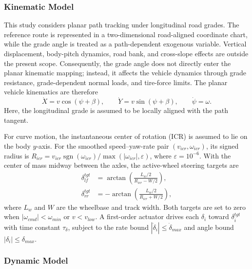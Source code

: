 \documentclass{ieeeaccess}
\begin{document}
\subsubsection{Kinematic Model}

This study considers planar path tracking under longitudinal road grades. The reference route is represented in a two-dimensional road-aligned coordinate chart, while the grade angle is treated as a path-dependent exogenous variable. Vertical displacement, body-pitch dynamics, road bank, and cross-slope effects are outside the present scope. Consequently, the grade angle does not directly enter the planar kinematic mapping; instead, it affects the vehicle dynamics through grade resistance, grade-dependent normal loads, and tire-force limits. The planar vehicle kinematics are therefore
\begin{equation}
\dot X=v\cos(\psi+\beta),\qquad
\dot Y=v\sin(\psi+\beta),\qquad
\dot\psi=\omega.
\label{eq:agv_kinematics}
\end{equation}
Here, the longitudinal grade is assumed to be locally aligned with the path tangent.

For curve motion, the instantaneous center of rotation (ICR) is assumed to lie on the body $y$-axis. For the smoothed speed--yaw-rate pair $(v_{icr},\omega_{icr})$, its signed radius is $R_{icr}=v_{icr}\operatorname{sgn}(\omega_{icr})/\max(|\omega_{icr}|,\varepsilon)$, where $\varepsilon=10^{-6}$. With the center of mass midway between the axles, the active-wheel steering targets are
\begin{equation}
\begin{aligned}
\delta_{lf}^{tgt}&=\arctan\!\left(\frac{L_w/2}{R_{icr}-W/2}\right),\\
\delta_{rr}^{tgt}&=-\arctan\!\left(\frac{L_w/2}{R_{icr}+W/2}\right),
\end{aligned}
\label{eq:agv_steering_geometry}
\end{equation}
where $L_w$ and $W$ are the wheelbase and track width. Both targets are set to zero when $|\omega_{cmd}|<\omega_{min}$ or $v<v_{low}$. A first-order actuator drives each $\delta_i$ toward $\delta_i^{tgt}$ with time constant $\tau_\delta$, subject to the rate bound $|\dot\delta_i|\leq\dot\delta_{max}$ and angle bound $|\delta_i|\leq\delta_{max}$.

\subsubsection{Dynamic Model}
\end{document}

